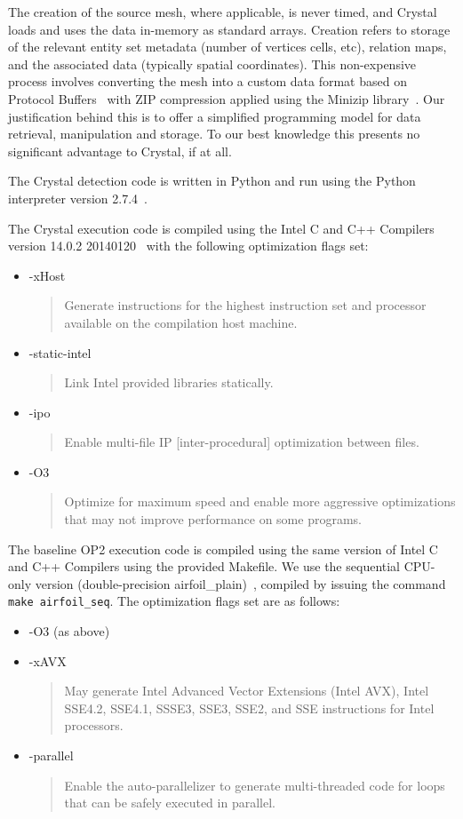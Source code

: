The creation of the source mesh, where applicable, is never timed, and Crystal loads and uses the data in-memory as standard arrays. Creation refers to storage of the relevant entity set metadata (number of vertices cells, etc), relation maps, and the associated data (typically spatial coordinates). This non-expensive process involves converting the mesh into a custom data format based on Protocol Buffers~\cite{protocolbuffers} with ZIP compression applied using the Minizip library~\cite{minizip}. Our justification behind this is to offer a simplified programming model for data retrieval, manipulation and storage. To our best knowledge this presents no significant advantage to Crystal, if at all.

The Crystal detection code is written in Python and run using the Python interpreter version 2.7.4~\cite{python}.

The Crystal execution code is compiled using the Intel\textregistered{} C and C++ Compilers version 14.0.2 20140120~\cite{icc} with the following optimization flags set:
\begin{itemize}
\item -xHost
\begin{quote}Generate instructions for the highest instruction set and processor available on the compilation host machine.\end{quote}
\item -static-intel
\begin{quote}Link Intel provided libraries statically.\end{quote}
\item -ipo
\begin{quote}Enable multi-file IP [inter-procedural] optimization between files.\end{quote}
\item -O3
\begin{quote}Optimize for maximum speed and enable more aggressive optimizations that may not improve performance on some programs.\end{quote}
\end{itemize}

The baseline OP2 execution code is compiled using the same version of Intel\textregistered{} C and C++ Compilers using the provided Makefile. We use the sequential CPU-only version (double-precision airfoil\_plain)~\cite{op2airfoil}, compiled by issuing the command \texttt{make airfoil\_seq}. The optimization flags set are as follows:
\begin{itemize}
\item -O3 (as above)
\item -xAVX
\begin{quote}May generate Intel\textregistered{} Advanced Vector Extensions (Intel\textregistered{} AVX), Intel\textregistered{} SSE4.2, SSE4.1, SSSE3, SSE3, SSE2, and SSE instructions for Intel\textregistered{} processors.\end{quote}
\item -parallel
\begin{quote}Enable the auto-parallelizer to generate multi-threaded code for loops that can be safely executed in parallel.\end{quote}
\end{itemize}



